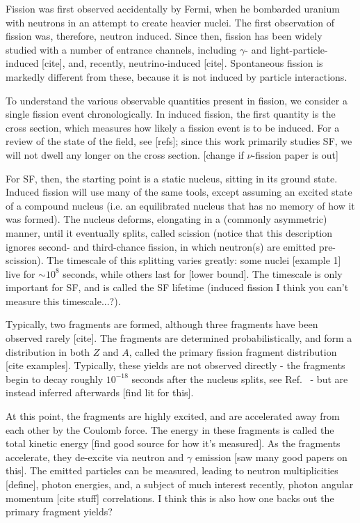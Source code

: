 \documentclass[../thesis.tex]{subfiles}
\begin{document}
\vspace{-1\baselineskip}

Fission was first observed accidentally by Fermi, when he bombarded uranium with neutrons in an attempt to create heavier nuclei. The first observation of fission was, therefore, neutron induced. Since then, fission has been widely studied with a number of entrance channels, including $\gamma$- and light-particle-induced [cite], and, recently, neutrino-induced [cite]. Spontaneous fission is markedly different from these, because it is not induced by particle interactions. 

To understand the various observable quantities present in fission, we consider a single fission event chronologically. In induced fission, the first quantity is the cross section, which measures how likely a fission event is to be induced. For a review of the state of the field, see [refs]; since this work primarily studies SF, we will not dwell any longer on the cross section. [change if $\nu$-fission paper is out]

For SF, then, the starting point is a static nucleus, sitting in its ground state. Induced fission will use many of the same tools, except assuming an excited state of a compound nucleus (i.e. an equilibrated nucleus that has no memory of how it was formed). The nucleus deforms, elongating in a (commonly asymmetric) manner, until it eventually splits, called scission (notice that this description ignores second- and third-chance fission, in which neutron(s) are emitted pre-scission). The timescale of this splitting varies greatly: some nuclei [example 1] live for $\sim10^8$ seconds, while others last for [lower bound]. The timescale is only important for SF, and is called the SF lifetime (induced fission I think you can't measure this timescale...?).

Typically, two fragments are formed, although three fragments have been observed rarely [cite]. The fragments are determined probabilistically, and form a distribution in both $Z$ and $A$, called the primary fission fragment distribution [cite examples]. Typically, these yields are not observed directly - the fragments begin to decay roughly $10^{-18}$ seconds after the nucleus splits, see Ref.~\cite{Bender2020} - but are instead inferred afterwards [find lit for this].

At this point, the fragments are highly excited, and are accelerated away from each other by the Coulomb force. The energy in these fragments is called the total kinetic energy [find good source for how it's measured]. As the fragments accelerate, they de-excite via neutron and $\gamma$ emission [saw many good papers on this]. The emitted particles can be measured, leading to neutron multiplicities [define], photon energies, and, a subject of much interest recently, photon angular momentum [cite stuff] correlations. I think this is also how one backs out the primary fragment yields?
\end{document}
